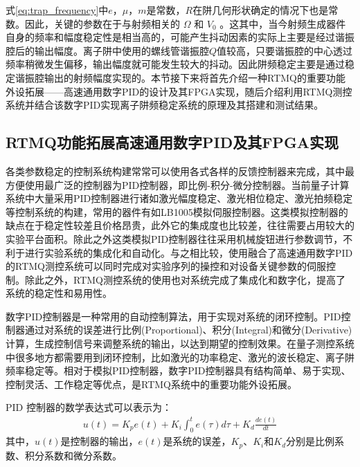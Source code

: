 式\eqref{eq:trap_frequency}中$e$，$\mu$，$m$是常数，$R$在阱几何形状确定的情况下也是常数。因此，关键的参数在于与射频相关的 $\Omega$ 和 $V_0$ 。这其中，当今射频生成器件自身的频率和幅度稳定性是相当高的，可能产生抖动因素的实际上主要是经过谐振腔后的输出幅度。离子阱中使用的螺线管谐振腔$Q$值较高，只要谐振腔的中心透过频率稍微发生偏移，输出幅度就可能发生较大的抖动。因此阱频稳定主要是通过稳定谐振腔输出的射频幅度实现的。本节接下来将首先介绍一种RTMQ的重要功能外设拓展——高速通用数字PID的设计及其FPGA实现，随后介绍利用RTMQ测控系统并结合该数字PID实现离子阱频稳定系统的原理及其搭建和测试结果。

\subsection[RTMQ功能拓展高速通用数字PID及其FPGA实现]{RTMQ功能拓展高速通用数字PID及其FPGA实现\label{section:digital_pid}}

各类参数稳定的控制系统构建常常可以使用各式各样的反馈控制器来完成，其中最方便使用最广泛的控制器为PID控制器，即比例-积分-微分控制器。当前量子计算系统中大量采用PID控制器进行诸如激光幅度稳定、激光相位稳定、激光拍频稳定等控制系统的构建，常用的器件有如LB1005模拟伺服控制器。这类模拟控制器的缺点在于稳定性较差且价格昂贵，此外它的集成度也比较差，往往需要占用较大的实验平台面积。除此之外这类模拟PID控制器往往采用机械旋钮进行参数调节，不利于进行实验系统的集成化和自动化。与之相比较，使用融合了高速通用数字PID的RTMQ测控系统可以同时完成对实验序列的操控和对设备关键参数的伺服控制。除此之外，RTMQ测控系统的使用也对系统完成了集成化和数字化，提高了系统的稳定性和易用性。

数字PID控制器是一种常用的自动控制算法，用于实现对系统的闭环控制。PID控制器通过对系统的误差进行比例(Proportional)、积分(Integral)和微分(Derivative)计算，生成控制信号来调整系统的输出，以达到期望的控制效果。在量子测控系统中很多地方都需要用到闭环控制，比如激光的功率稳定、激光的波长稳定、离子阱频率稳定等。相对于模拟PID控制器，数字PID控制器具有结构简单、易于实现、控制灵活、工作稳定等优点，是RTMQ系统中的重要功能外设拓展。

PID 控制器的数学表达式可以表示为：
\begin{align}
    u(t)= K_p e(t) + K_i \int_{0}^{t} e(\tau) d\tau + K_d \frac{d e(t)}{dt}
\end{align}
其中，$u(t)$是控制器的输出，$e(t)$是系统的误差，$K_p$、$K_i$和$K_d$分别是比例系数、积分系数和微分系数。
 
